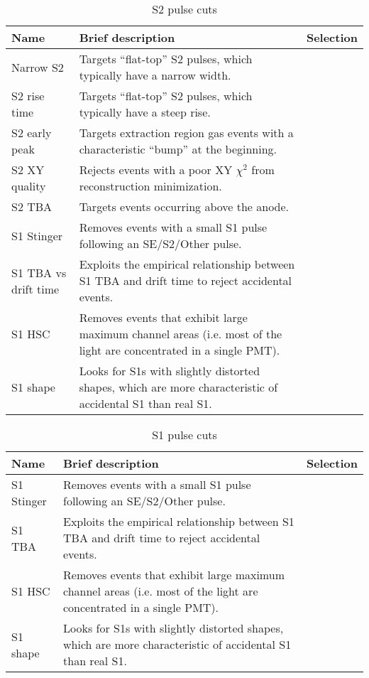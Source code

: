 \begin{table}[h!]
    \centering
    \caption{S2 pulse cuts}
    \begin{tabular}{|m{10em}m{12em}m{10em}|}
    \hline
    \textbf{Name} & \textbf{Brief description}& \textbf{Selection} \\
    \hline\hline
    Narrow S2 &Targets “flat-top” S2 pulses, which typically have a narrow width. & \\
    \hline
    S2 rise time & Targets “flat-top” S2 pulses, which typically have a steep rise.& \\
    \hline
    S2 early peak & Targets extraction region gas events with a characteristic “bump” at the beginning.& \\
    \hline
    S2 XY quality & Rejects events with a poor XY $\chi^2$ from reconstruction minimization. & \\
    \hline
    S2 TBA & Targets events occurring above the anode. & \\
    \hline
    S1 Stinger & Removes events with a small S1 pulse following an SE/S2/Other pulse. & \\
    \hline
    S1 TBA vs drift time& Exploits the empirical relationship between S1 TBA and drift time to reject accidental events. & \\
    \hline
    S1 HSC & Removes events that exhibit large maximum channel areas (i.e. most of the light are concentrated in a single PMT). & \\
    \hline
    S1 shape & Looks for S1s with slightly distorted shapes, which are more characteristic of accidental S1 than real S1.& \\
    \hline
    \end{tabular}
\end{table}

\begin{table}[h!]
    \centering
    \caption{S1 pulse cuts}
    \begin{tabular}{|m{10em}m{12em}m{10em}|}
    \hline
    \textbf{Name} & \textbf{Brief description}& \textbf{Selection} \\
    \hline\hline
    S1 Stinger & Removes events with a small S1 pulse following an SE/S2/Other pulse. & \\
    \hline
    S1 TBA & Exploits the empirical relationship between S1 TBA and drift time to reject accidental events. & \\
    \hline
    S1 HSC & Removes events that exhibit large maximum channel areas (i.e. most of the light are concentrated in a single PMT). & \\
    \hline
    S1 shape & Looks for S1s with slightly distorted shapes, which are more characteristic of accidental S1 than real S1.& \\
    \hline\hline
    \end{tabular}
\end{table}